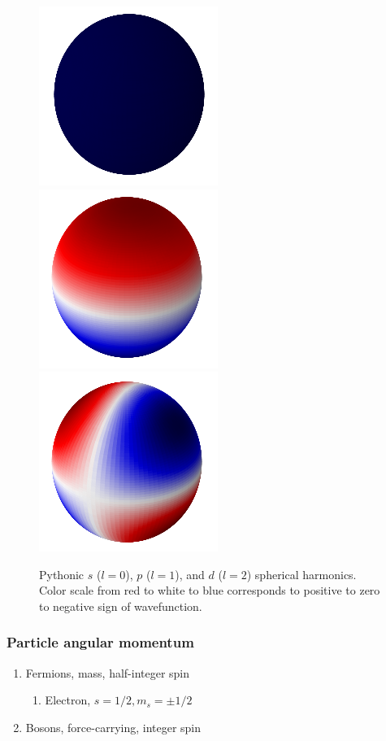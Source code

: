 \documentclass[11pt]{article}
\begin{document}
\begin{figure}
\includegraphics[scale=0.4]{./Images/s.png}
\includegraphics[scale=0.4]{./Images/p.png}
\includegraphics[scale=0.4]{./Images/d.png}
\caption{Pythonic $s$ ($l = 0$), $p$ ($l=1$), and $d$ ($l=2$) spherical harmonics. Color scale from red to white to blue corresponds to positive to zero to negative sign of wavefunction.}
\end{figure}

\subsubsection{Particle angular momentum}
\label{sec:org06704fd}
\begin{enumerate}
\item Fermions, mass, half-integer spin
\begin{enumerate}
\item Electron, \(s=1/2, m_s=\pm 1/2\)
\end{enumerate}
\item Bosons, force-carrying, integer spin
\end{enumerate}
\end{document}
